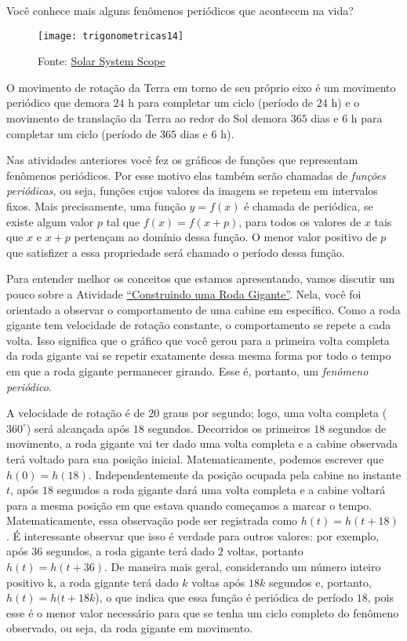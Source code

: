 Você conhece mais alguns fenômenos periódicos que acontecem na vida?


\begin{figure}[H]
\centering

\texttt{[image: trigonometricas14]}
\caption{Fonte: \href{https://www.solarsystemscope.com/}{Solar System Scope}}

\end{figure}

O movimento de rotação da Terra em torno de seu próprio eixo é um movimento periódico que demora $24$ h para completar um ciclo (período de $24$ h) e o movimento de translação da Terra ao redor do Sol demora $365$ dias e $6$ h para completar um ciclo (período de $365$ dias e $6$ h).

Nas atividades anteriores você fez os gráficos de funções que representam fenômenos periódicos. Por esse motivo elas também serão chamadas de \textit{funções periódicas}, ou seja, funções cujos valores da imagem se repetem em intervalos fixos. Mais precisamente, uma função $y=f(x)$ é chamada de periódica, se existe algum valor $p$ tal que $f(x)=f(x+p)$, para todos os valores de $x$ tais que $x$ e $x+p$ pertençam ao domínio dessa função. O menor valor positivo de $p$ que satisfizer a essa propriedade será chamado o período dessa função.

Para entender melhor os conceitos que estamos apresentando, vamos discutir um pouco sobre a Atividade \hyperref[trig-ativ1]{“Construindo uma Roda Gigante”}. Nela, você foi orientado a observar o comportamento de uma cabine em específico. Como a roda gigante tem velocidade de rotação constante, o comportamento se repete a cada volta. Isso significa que o gráfico que você gerou para a primeira volta completa da roda gigante vai se repetir exatamente dessa mesma forma por todo o tempo em que a roda gigante permanecer girando. Esse é, portanto, um \textit{fenômeno periódico}.


A velocidade de rotação é de $20$ graus por segundo; logo, uma volta completa ($360^{\circ}$) será alcançada após $18$ segundos. Decorridos os primeiros $18$ segundos de movimento, a roda gigante vai ter dado uma volta completa e a cabine observada terá voltado para sua posição inicial. Matematicamente, podemos escrever que $h(0)=h(18)$. Independentemente da posição ocupada pela cabine no instante $t$, após $18$ segundos a roda gigante dará uma volta completa e a cabine voltará para a mesma posição em que estava quando começamos a marcar o tempo. Matematicamente, essa observação pode ser registrada como  $h(t)=h(t+18)$. É interessante observar que isso é verdade para outros valores: por exemplo, após 36 segundos, a roda gigante terá dado $2$ voltas, portanto $h(t)=h(t+36)$.
De maneira mais geral, considerando um número inteiro positivo k, a roda gigante terá dado $k$ voltas após $18k$ segundos  e, portanto, $h(t)=h(t+18k$), o que indica que essa função é periódica de período $18$, pois esse é o menor valor necessário para que se tenha um ciclo completo do fenômeno observado, ou seja, da roda gigante em movimento.


